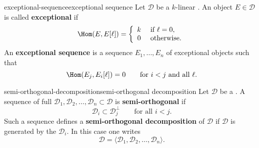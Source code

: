 \begin{topic}{exceptional-sequence}{exceptional sequence}
    Let $\mathcal{D}$ be a $k$-linear . An object $E \in \mathcal{D}$ is called \textbf{exceptional} if
    \[ \Hom(E, E[\ell]) = \left\{\begin{array}{cl} k & \text{ if } \ell = 0, \\ 0 & \text{ otherwise.} \end{array}\right. \]
    An \textbf{exceptional sequence} is a sequence $E_1, \ldots, E_n$ of exceptional objects such that
    \[ \Hom(E_j, E_i[\ell]) = 0 \qquad \text{for $i < j$ and all $\ell$}. \]
\end{topic}

\begin{topic}{semi-orthogonal-decomposition}{semi-orthogonal decomposition}
    Let $\mathcal{D}$ be a . A sequence of full   $\mathcal{D}_1, \mathcal{D}_2, \ldots, \mathcal{D}_n \subset \mathcal{D}$ is \textbf{semi-orthogonal} if
    \[ \mathcal{D}_i \subset \mathcal{D}_j^\perp \qquad \text{for all $i < j$}. \]
    Such a sequence defines a \textbf{semi-orthogonal decomposition} of $\mathcal{D}$ if $\mathcal{D}$ is generated by the $\mathcal{D}_i$. In this case one writes
    \[ \mathcal{D} = \langle \mathcal{D}_1, \mathcal{D}_2, \ldots, \mathcal{D}_n \rangle . \]
\end{topic}
